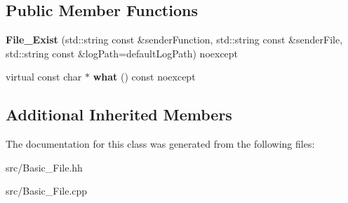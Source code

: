 \subsection*{Public Member Functions}
\begin{DoxyCompactItemize}
\item 
\hypertarget{classstb_1_1File__Exist_ac14905b98080244a59bf2b7dcad89a1b}{{\bfseries File\+\_\+\+Exist} (std\+::string const \&sender\+Function, std\+::string const \&sender\+File, std\+::string const \&log\+Path=default\+Log\+Path) noexcept}\label{classstb_1_1File__Exist_ac14905b98080244a59bf2b7dcad89a1b}

\item 
\hypertarget{classstb_1_1File__Exist_a997f7c012e0607b0c3de806fa5c57323}{virtual const char $\ast$ {\bfseries what} () const noexcept}\label{classstb_1_1File__Exist_a997f7c012e0607b0c3de806fa5c57323}

\end{DoxyCompactItemize}
\subsection*{Additional Inherited Members}


The documentation for this class was generated from the following files\+:\begin{DoxyCompactItemize}
\item 
src/Basic\+\_\+\+File.\+hh\item 
src/Basic\+\_\+\+File.\+cpp\end{DoxyCompactItemize}
